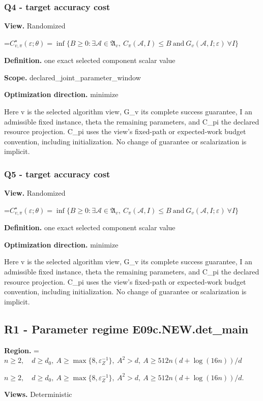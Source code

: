 \documentclass[10pt,a4paper]{article}
\newcommand{\AtlasMath}[1]{\par\begingroup\centering\setbox0=\hbox{$\displaystyle #1$}\ifdim\wd0>1.4\linewidth\typeout{ATLAS WIDE FORMULA: \the\wd0}\fi\ifdim\wd0>\linewidth\resizebox{\linewidth}{!}{\box0}\else\box0\fi\par\endgroup}
\newcommand{\AtlasInlineMath}[1]{\begingroup\setbox0=\hbox{$#1$}\ifdim\wd0>.4\linewidth\endgroup\AtlasMath{#1}\else\endgroup$#1$\fi}
\begin{document}
\subsubsection{Q4 - target accuracy cost}
\textbf{View.} Randomized

\AtlasMath{C^\star_{v,\pi}(\varepsilon;\theta)=\inf\{B\ge0:\exists\mathcal A\in\mathfrak A_v,\ C_\pi(\mathcal A,I)\le B\ \text{and}\ G_v(\mathcal A,I;\varepsilon)\ \forall I\}}
\textbf{Definition.} one exact selected component scalar value

\textbf{Scope.} declared\_joint\_parameter\_window

\textbf{Optimization direction.} minimize

Here v is the selected algorithm view, G\_v its complete success guarantee, I an admissible fixed instance, theta the remaining parameters, and C\_pi the declared resource projection. C\_pi uses the view's fixed-path or expected-work budget convention, including initialization. No change of guarantee or scalarization is implicit.

\subsubsection{Q5 - target accuracy cost}
\textbf{View.} Randomized

\AtlasMath{C^\star_{v,\pi}(\varepsilon;\theta)=\inf\{B\ge0:\exists\mathcal A\in\mathfrak A_v,\ C_\pi(\mathcal A,I)\le B\ \text{and}\ G_v(\mathcal A,I;\varepsilon)\ \forall I\}}
\textbf{Definition.} one exact selected component scalar value

\textbf{Optimization direction.} minimize

Here v is the selected algorithm view, G\_v its complete success guarantee, I an admissible fixed instance, theta the remaining parameters, and C\_pi the declared resource projection. C\_pi uses the view's fixed-path or expected-work budget convention, including initialization. No change of guarantee or scalarization is implicit.

\subsection{R1 - Parameter regime E09c.NEW.det\_main}
\textbf{Region.} \AtlasInlineMath{n\ge 2,\quad d\ge d_0,\ A\ge\max\{8,\varepsilon_Z^{-1}\},\ A^2>d,\ A\ge512n(d+\log(16n))/d}.

\textbf{Views.} Deterministic
\end{document}
